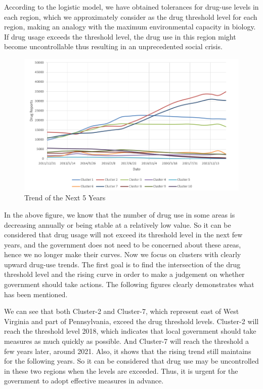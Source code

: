 \documentclass[12pt]{article}
\begin{document}
According to the logistic model, we have obtained tolerances for drug-use levels in each region, which we approximately consider as the drug threshold level for each region, making an analogy with the maximum environmental capacity in biology. If drug usage exceeds the threshold level, the drug use in this region might become uncontrollable thus resulting in an unprecedented social crisis.

\begin{figure}[H]
	\centering
	\includegraphics[scale=0.7]{./figures/5.png}
	\caption{Trend of the Next 5 Years}
	\label{Fig5}
\end{figure}

In the above figure, we know that the number of drug use in some areas is decreasing annually or being stable at a relatively low value. So it can be considered that drug usage will not exceed its threshold level in the next few years, and the government does not need to be concerned about these areas, hence we no longer make their curves. Now we focus on clusters with clearly upward drug-use trends. The first goal is to find the intersection of the drug threshold level and the rising curve in order to make a judgement on whether government should take actions. The following figures clearly demonstrates what has been mentioned.

We can see that both Cluster-2 and Cluster-7, which represent east of West Virginia and part of Pennsylvania, exceed the drug threshold levels. Cluster-2 will reach the threshold level 2018, which indicates that local government should take measures as much quickly as possible. And Cluster-7 will reach the threshold a few years later, around 2021. Also, it shows that the rising trend still maintains for the following years. So it can be considered that drug use may be uncontrolled in these two regions when the levels are exceeded. Thus, it is urgent for the government to adopt effective measures in advance.
\end{document}
